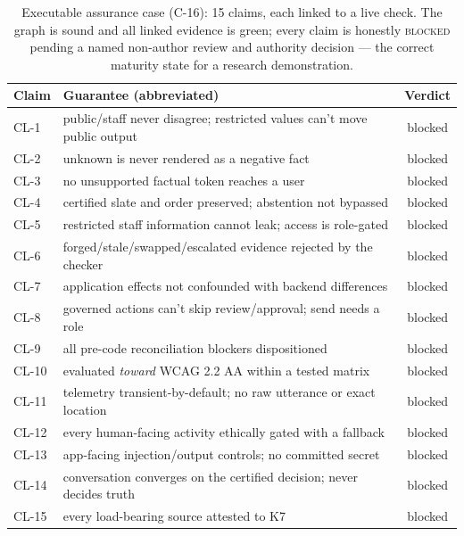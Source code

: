 \begin{table}[t]
\centering
\caption{Executable assurance case (C-16): 15 claims, each linked to a live check. The graph is sound
and all linked evidence is green; every claim is honestly \textsc{blocked} pending a named non-author
review and authority decision --- the correct maturity state for a research demonstration.}
\label{tab:assurance}
\begin{tabular}{@{}llc@{}}
\toprule
Claim & Guarantee (abbreviated) & Verdict \\
\midrule
CL-1  & public/staff never disagree; restricted values can't move public output & blocked \\
CL-2  & unknown is never rendered as a negative fact & blocked \\
CL-3  & no unsupported factual token reaches a user & blocked \\
CL-4  & certified slate and order preserved; abstention not bypassed & blocked \\
CL-5  & restricted staff information cannot leak; access is role-gated & blocked \\
CL-6  & forged/stale/swapped/escalated evidence rejected by the checker & blocked \\
CL-7  & application effects not confounded with backend differences & blocked \\
CL-8  & governed actions can't skip review/approval; send needs a role & blocked \\
CL-9  & all pre-code reconciliation blockers dispositioned & blocked \\
CL-10 & evaluated \emph{toward} WCAG 2.2 AA within a tested matrix & blocked \\
CL-11 & telemetry transient-by-default; no raw utterance or exact location & blocked \\
CL-12 & every human-facing activity ethically gated with a fallback & blocked \\
CL-13 & app-facing injection/output controls; no committed secret & blocked \\
CL-14 & conversation converges on the certified decision; never decides truth & blocked \\
CL-15 & every load-bearing source attested to K7 & blocked \\
\bottomrule
\end{tabular}
\end{table}


